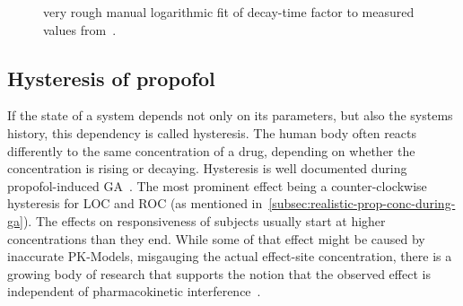 \begin{figure}[H]
    \centering
    \pgfplotsset{compat = newest}

    \caption{very rough manual logarithmic fit of decay-time factor to measured values
    from~\cite{kitamura_effects_2003}.}
    \label{fig:lambda_fit}
\end{figure}


\subsection{Hysteresis of propofol}
If the state of a system depends not only on its parameters, but also the systems history,
this dependency is called hysteresis.
The human body often reacts differently to the same concentration of a drug,
depending on whether the concentration is rising or decaying.
Hysteresis is well documented during propofol-induced GA~\cite{kuizenga_quantitative_1998,
    iwakiri_individual_2005,
    sepulveda_evidence_2018,ferreira_patterns_2020, su_hysteresis_2020}.
The most prominent effect being a counter-clockwise hysteresis for LOC and ROC (as mentioned
in~\ref{subsec:realistic-prop-conc-during-ga}).
The effects on responsiveness of subjects usually start at higher concentrations than they end.
While some of that effect might be caused by inaccurate PK-Models,
misgauging the actual effect-site concentration,
there is a growing body of research that supports the notion that the observed effect is independent of
pharmacokinetic interference~\cite{hutt_progress_2011, su_hysteresis_2020}.

